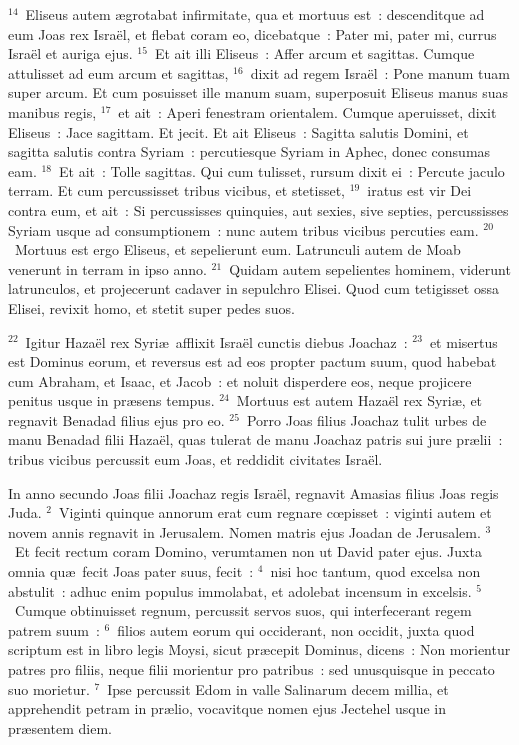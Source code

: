 ${}^{14}$~Eliseus autem \ae grotabat infirmitate, qua et mortuus est~: descenditque ad eum Joas rex Isra\"el, et flebat coram eo, dicebatque~: Pater mi, pater mi, currus Isra\"el et auriga ejus.
${}^{15}$~Et ait illi Eliseus~: Affer arcum et sagittas. Cumque attulisset ad eum arcum et sagittas,
${}^{16}$~dixit ad regem Isra\"el~: Pone manum tuam super arcum. Et cum posuisset ille manum suam, superposuit Eliseus manus suas manibus regis,
${}^{17}$~et ait~: Aperi fenestram orientalem. Cumque aperuisset, dixit Eliseus~: Jace sagittam. Et jecit. Et ait Eliseus~: Sagitta salutis Domini, et sagitta salutis contra Syriam~: percutiesque Syriam in Aphec, donec consumas eam.
${}^{18}$~Et ait~: Tolle sagittas. Qui cum tulisset, rursum dixit ei~: Percute jaculo terram. Et cum percussisset tribus vicibus, et stetisset,
${}^{19}$~iratus est vir Dei contra eum, et ait~: Si percussisses quinquies, aut sexies, sive septies, percussisses Syriam usque ad consumptionem~: nunc autem tribus vicibus percuties eam.
${}^{20}$~Mortuus est ergo Eliseus, et sepelierunt eum. Latrunculi autem de Moab venerunt in terram in ipso anno.
${}^{21}$~Quidam autem sepelientes hominem, viderunt latrunculos, et projecerunt cadaver in sepulchro Elisei. Quod cum tetigisset ossa Elisei, revixit homo, et stetit super pedes suos.


${}^{22}$~Igitur Haza\"el rex Syri\ae\ afflixit Isra\"el cunctis diebus Joachaz~:
${}^{23}$~et misertus est Dominus eorum, et reversus est ad eos propter pactum suum, quod habebat cum Abraham, et Isaac, et Jacob~: et noluit disperdere eos, neque projicere penitus usque in pr\ae sens tempus.
${}^{24}$~Mortuus est autem Haza\"el rex Syri\ae , et regnavit Benadad filius ejus pro eo.
${}^{25}$~Porro Joas filius Joachaz tulit urbes de manu Benadad filii Haza\"el, quas tulerat de manu Joachaz patris sui jure pr\ae lii~: tribus vicibus percussit eum Joas, et reddidit civitates Isra\"el.

\lettrine[lines=10,image=true,loversize=0.05,lraise=-0.03]{I}{}n anno secundo Joas filii Joachaz regis Isra\"el, regnavit Amasias filius Joas regis Juda.
${}^{2}$~Viginti quinque annorum erat cum regnare cœpisset~: viginti autem et novem annis regnavit in Jerusalem. Nomen matris ejus Joadan de Jerusalem.
${}^{3}$~Et fecit rectum coram Domino, verumtamen non ut David pater ejus. Juxta omnia qu\ae\ fecit Joas pater suus, fecit~:
${}^{4}$~nisi hoc tantum, quod excelsa non abstulit~: adhuc enim populus immolabat, et adolebat incensum in excelsis.
${}^{5}$~Cumque obtinuisset regnum, percussit servos suos, qui interfecerant regem patrem suum~:
${}^{6}$~filios autem eorum qui occiderant, non occidit, juxta quod scriptum est in libro legis Moysi, sicut pr\ae cepit Dominus, dicens~: Non morientur patres pro filiis, neque filii morientur pro patribus~: sed unusquisque in peccato suo morietur.
${}^{7}$~Ipse percussit Edom in valle Salinarum decem millia, et apprehendit petram in pr\ae lio, vocavitque nomen ejus Jectehel usque in pr\ae sentem diem.



